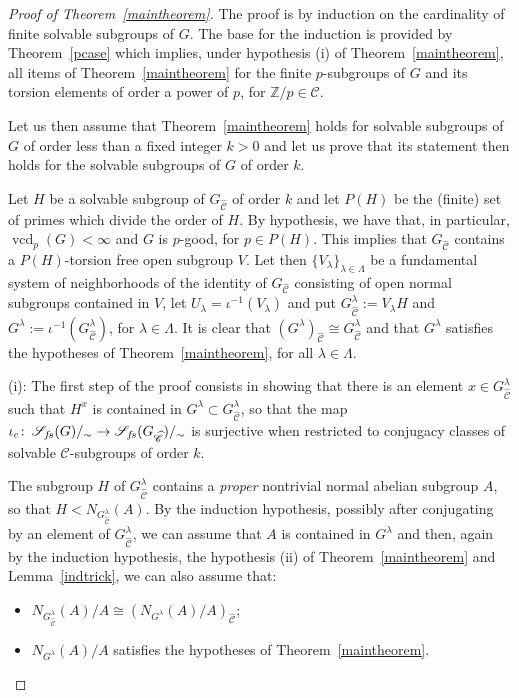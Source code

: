 \documentclass[12pt,twoside]{amsart}
\newcommand\Z{{\mathbb Z}}
\newcommand\cC{{\mathscr C}}
\newcommand\cS{{\mathscr S}}
\newcommand\ld{\lambda}
\newcommand\Ld{\Lambda}
\def\co{\colon\thinspace}
\newcommand\vcd{\operatorname{vcd}}
\def\wC{{\widehat{\cC}}}
\theoremstyle{definition}
\begin{document}
\begin{proof}[Proof of Theorem~\ref{maintheorem}]
The proof is by induction on the cardinality of finite solvable subgroups of $G$. The base for the induction is provided by Theorem~\ref{pcase} 
which implies, under hypothesis (i) of Theorem~\ref{maintheorem}, all items of Theorem~\ref{maintheorem} for the finite $p$-subgroups 
of $G$ and its torsion elements of order a power of $p$, for $\Z/p\in\cC$. 

Let us then assume that Theorem~\ref{maintheorem} holds for solvable subgroups of $G$ of order less than a fixed integer $k>0$ and let us prove 
that its statement then holds for the solvable subgroups of $G$ of order $k$. 

Let $H$ be a solvable subgroup of $G_\wC$ of order $k$ and let $P(H)$ be the (finite) set of primes which divide the order of $H$.
By hypothesis, we have that, in particular, $\vcd_p(G)<\infty$ and $G$ is $p$-good, for $p\in P(H)$. This implies that $G_\wC$ contains a 
$P(H)$-torsion free open subgroup $V$. Let then $\{V_\ld\}_{\ld\in\Ld}$ be a fundamental system of neighborhoods of the identity of 
$G_\wC$ consisting of open normal subgroups contained in $V$, let $U_\ld=\iota^{-1}(V_\ld)$ and put $G_\wC^\ld:=V_\ld H$ and 
$G^\ld:=\iota^{-1}(G_\wC^\ld)$, for $\ld\in\Ld$. It is clear that $(G^\ld)_\wC\cong G_\wC^\ld$ and that $G^\ld$ satisfies the hypotheses 
of Theorem~\ref{maintheorem}, for all $\ld\in\Ld$.
\smallskip

\noindent
(i): The first step of the proof consists in showing that there is an element $x\in G_\wC^\ld$ such that $H^x$ is contained in $G^\ld\subset G_\wC^\ld$,
so that the map $\iota_c\co\cS_{f\!s}(G)/_{\sim}\to\cS_{f\!s}(G_{\wC})/_{\sim}$ is surjective when restricted to conjugacy classes of solvable
$\cC$-subgroups of order $k$.

The subgroup $H$ of $G_\wC^\ld$ contains a \emph{proper} nontrivial normal abelian subgroup $A$, so that
$H<N_{G_\wC^\ld}(A)$. By the induction hypothesis, possibly after conjugating by an element of $G_\wC^\ld$, 
we can assume that $A$ is contained in $G^\ld$ and then, again by the induction hypothesis, 
the hypothesis (ii) of Theorem~\ref{maintheorem} and Lemma~\ref{indtrick}, we can also assume that:
\begin{itemize}
\item $N_{G_\wC^\ld}(A)/A\cong(N_{G^\ld}(A)/A)_\wC$;
\item $N_{G^\ld}(A)/A$ satisfies the hypotheses of Theorem~\ref{maintheorem}.
\end{itemize}


\end{proof}
\end{document}
